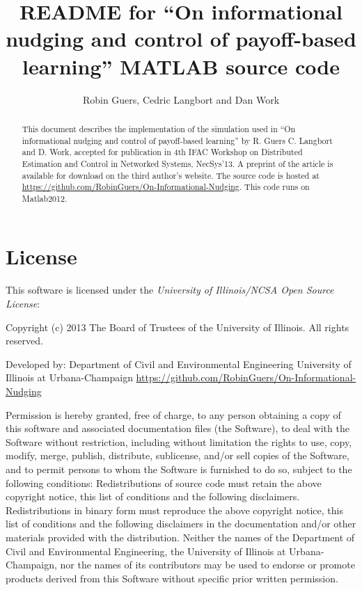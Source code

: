 \documentclass[english]{article}
\begin{document}
\title{README for ``On informational nudging and control of payoff-based learning'' MATLAB source code}


\author{Robin Guers, Cedric Langbort and Dan Work}
\maketitle
\begin{abstract}
This document describes the implementation of the simulation used in ``On informational nudging and control of payoff-based learning'' by R. Guers C. Langbort and D. Work, accepted for publication in 4th IFAC Workshop on Distributed Estimation and Control in Networked Systems, NecSys'13.
A preprint of the article is available for download on the third
author's website. The source code is hosted at \url{https://github.com/RobinGuers/On-Informational-Nudging}.
This code runs on Matlab2012.
\end{abstract}

\section{License}

This software is licensed under the \emph{University of Illinois/NCSA
Open Source License}:

\begin{center}
Copyright (c) 2013 The Board of Trustees of the University of Illinois.
All rights reserved.
\par\end{center}

\begin{center}
Developed by: Department of Civil and Environmental Engineering University
of Illinois at Urbana-Champaign \url{https://github.com/RobinGuers/On-Informational-Nudging}
\par\end{center}

Permission is hereby granted, free of charge, to any person obtaining
a copy of this software and associated documentation files (the \textquotedbl{}Software\textquotedbl{}),
to deal with the Software without restriction, including without limitation
the rights to use, copy, modify, merge, publish, distribute, sublicense,
and/or sell copies of the Software, and to permit persons to whom
the Software is furnished to do so, subject to the following conditions:
Redistributions of source code must retain the above copyright notice,
this list of conditions and the following disclaimers. Redistributions
in binary form must reproduce the above copyright notice, this list
of conditions and the following disclaimers in the documentation and/or
other materials provided with the distribution. Neither the names
of the Department of Civil and Environmental Engineering, the University
of Illinois at Urbana-Champaign, nor the names of its contributors
may be used to endorse or promote products derived from this Software
without specific prior written permission.
\end{document}
